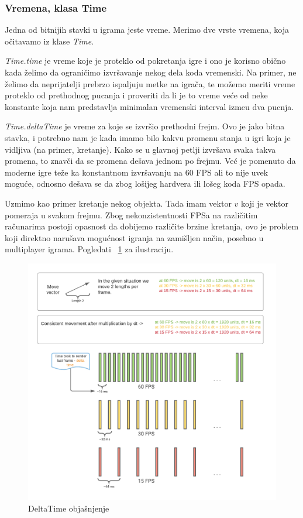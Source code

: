 \subsubsection{Vremena, klasa Time}
Jedna od bitnijih stavki u igrama jeste vreme. Merimo dve vrste vremena, koja o\v{c}itavamo iz klase \emph{Time}.

\emph{Time.time} je vreme koje je proteklo od pokretanja igre i ono je korisno
obi\v{c}no kada \v{z}elimo da ograni\v{c}imo izvr\v{s}avanje nekog dela koda vremenski.
Na primer, ne \v{z}elimo da neprijatelji prebrzo ispaljuju metke na igra\v{c}a, te mo\v{z}emo meriti
vreme proteklo od prethodnog pucanja i proveriti da li je to vreme ve\'ce od neke konstante
koja nam predstavlja minimalan vremenski interval izme\dj u dva pucnja.

\emph{Time.deltaTime} je vreme za koje se izvr\v{s}io prethodni frejm. Ovo je jako bitna stavka,
i potrebno nam je kada imamo bilo kakvu promenu stanja u igri koja je vidljiva (na primer, kretanje). Kako se u glavnoj petlji
izvr\v{s}ava svaka takva promena, to znav\v{c}i da se promena de\v{s}ava jednom po frejmu. Ve\'c je pomenuto
da moderne igre te\v{z}e ka konstantnom izvr\v{s}avanju na 60 FPS ali to nije uvek mogu\'ce, odnosno de\v{s}ava
se da zbog lo\v{s}ijeg hardvera ili lo\v{s}eg koda FPS opada.

Uzmimo kao primer kretanje nekog objekta. Tada imam vektor $v$ koji je vektor pomeraja u svakom
frejmu. Zbog nekonzistentnosti FPSa na razli\v{c}itim ra\v{c}unarima postoji opasnost da dobijemo razli\v{c}ite 
brzine kretanja, ovo je problem koji direktno naru\v{s}ava mogu\'cnost igranja na zami\v{s}ljen na\v{c}in,
posebno u multiplayer igrama. Pogledati ~\ref{fig:deltatime} za ilustraciju. 

\begin{center}
    \begin{figure}
        \includegraphics[width=1\textwidth]{Figures/DeltaTime.pdf}
        \caption{DeltaTime obja\v{s}njenje}
        \label{fig:deltatime}
    \end{figure}
\end{center}

